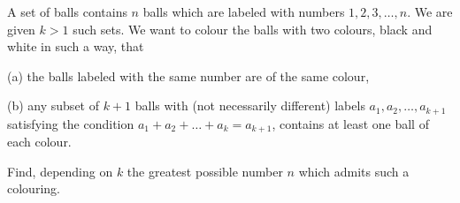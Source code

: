 A set of balls contains $ n$ balls which are labeled with numbers $ 1,2,3,\ldots,n.$ We are given $ k > 1$ such sets. We want to colour the balls with two colours, black and white in such a way, that

(a) the balls labeled with the same number are of the same colour,

(b) any subset of $ k+1$ balls with (not necessarily different) labels $ a_{1},a_{2},\ldots,a_{k+1}$ satisfying the condition $ a_{1}+a_{2}+\ldots+a_{k}= a_{k+1}$,  contains at least one ball of each colour.

Find, depending on $ k$ the greatest possible number $ n$ which admits such a colouring.